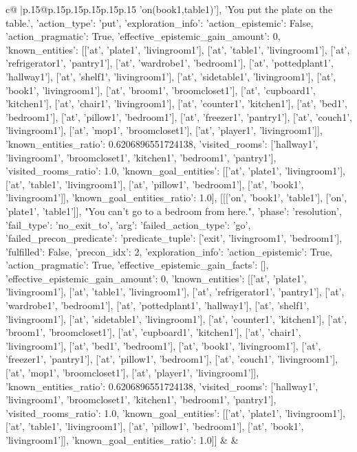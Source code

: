 \documentclass{article}
\begin{document}
{\begin{supertabular}{c@{$\;$}|p{.15\linewidth}@{}p{.15\linewidth}p{.15\linewidth}p{.15\linewidth}p{.15\linewidth}p{.15\linewidth}}
{{{'on(book1,table1)'], 'You put the plate on the table.', {'action_type': 'put', 'exploration_info': {'action_epistemic': False, 'action_pragmatic': True, 'effective_epistemic_gain_amount': 0, 'known_entities': [['at', 'plate1', 'livingroom1'], ['at', 'table1', 'livingroom1'], ['at', 'refrigerator1', 'pantry1'], ['at', 'wardrobe1', 'bedroom1'], ['at', 'pottedplant1', 'hallway1'], ['at', 'shelf1', 'livingroom1'], ['at', 'sidetable1', 'livingroom1'], ['at', 'book1', 'livingroom1'], ['at', 'broom1', 'broomcloset1'], ['at', 'cupboard1', 'kitchen1'], ['at', 'chair1', 'livingroom1'], ['at', 'counter1', 'kitchen1'], ['at', 'bed1', 'bedroom1'], ['at', 'pillow1', 'bedroom1'], ['at', 'freezer1', 'pantry1'], ['at', 'couch1', 'livingroom1'], ['at', 'mop1', 'broomcloset1'], ['at', 'player1', 'livingroom1']], 'known_entities_ratio': 0.6206896551724138, 'visited_rooms': ['hallway1', 'livingroom1', 'broomcloset1', 'kitchen1', 'bedroom1', 'pantry1'], 'visited_rooms_ratio': 1.0, 'known_goal_entities': [['at', 'plate1', 'livingroom1'], ['at', 'table1', 'livingroom1'], ['at', 'pillow1', 'bedroom1'], ['at', 'book1', 'livingroom1']], 'known_goal_entities_ratio': 1.0}}], [[['on', 'book1', 'table1'], ['on', 'plate1', 'table1']], "You can't go to a bedroom from here.", {'phase': 'resolution', 'fail_type': 'no_exit_to', 'arg': {'failed_action_type': 'go', 'failed_precon_predicate': {'predicate_tuple': ['exit', 'livingroom1', 'bedroom1'], 'fulfilled': False, 'precon_idx': 2}}, 'exploration_info': {'action_epistemic': True, 'action_pragmatic': True, 'effective_epistemic_gain_facts': [], 'effective_epistemic_gain_amount': 0, 'known_entities': [['at', 'plate1', 'livingroom1'], ['at', 'table1', 'livingroom1'], ['at', 'refrigerator1', 'pantry1'], ['at', 'wardrobe1', 'bedroom1'], ['at', 'pottedplant1', 'hallway1'], ['at', 'shelf1', 'livingroom1'], ['at', 'sidetable1', 'livingroom1'], ['at', 'counter1', 'kitchen1'], ['at', 'broom1', 'broomcloset1'], ['at', 'cupboard1', 'kitchen1'], ['at', 'chair1', 'livingroom1'], ['at', 'bed1', 'bedroom1'], ['at', 'book1', 'livingroom1'], ['at', 'freezer1', 'pantry1'], ['at', 'pillow1', 'bedroom1'], ['at', 'couch1', 'livingroom1'], ['at', 'mop1', 'broomcloset1'], ['at', 'player1', 'livingroom1']], 'known_entities_ratio': 0.6206896551724138, 'visited_rooms': ['hallway1', 'livingroom1', 'broomcloset1', 'kitchen1', 'bedroom1', 'pantry1'], 'visited_rooms_ratio': 1.0, 'known_goal_entities': [['at', 'plate1', 'livingroom1'], ['at', 'table1', 'livingroom1'], ['at', 'pillow1', 'bedroom1'], ['at', 'book1', 'livingroom1']], 'known_goal_entities_ratio': 1.0}}]] 
	  } 
	   } 
	   } 
	 & & \\ 
 


\end{supertabular}}
\end{document}
